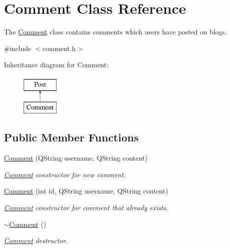 \hypertarget{classComment}{}\section{Comment Class Reference}
\label{classComment}


The \hyperlink{classComment}{Comment} class contains comments which users have posted on blogs.  




{\ttfamily \#include $<$comment.\+h$>$}

Inheritance diagram for Comment\+:\begin{figure}[H]
\begin{center}
\leavevmode
\includegraphics[height=2.000000cm]{classComment}
\end{center}
\end{figure}
\subsection*{Public Member Functions}
\begin{DoxyCompactItemize}
\item 
\hyperlink{classComment_adcae7a004fc156a6b7c78958270cd7b3}{Comment} (Q\+String username, Q\+String content)
\begin{DoxyCompactList}\small\item\em \hyperlink{classComment}{Comment} constructor for new comment. \end{DoxyCompactList}\item 
\hyperlink{classComment_aec795fcc28db5ef7e42609824df3560c}{Comment} (int id, Q\+String username, Q\+String content)
\begin{DoxyCompactList}\small\item\em \hyperlink{classComment}{Comment} constructor for comment that already exists. \end{DoxyCompactList}\item 
\hyperlink{classComment_aea2c5f6168b3bfdc1dbb7bb99ac44454}{$\sim$\+Comment} ()\hypertarget{classComment_aea2c5f6168b3bfdc1dbb7bb99ac44454}{}\label{classComment_aea2c5f6168b3bfdc1dbb7bb99ac44454}

\begin{DoxyCompactList}\small\item\em \hyperlink{classComment}{Comment} destructor. \end{DoxyCompactList}\end{DoxyCompactItemize}
